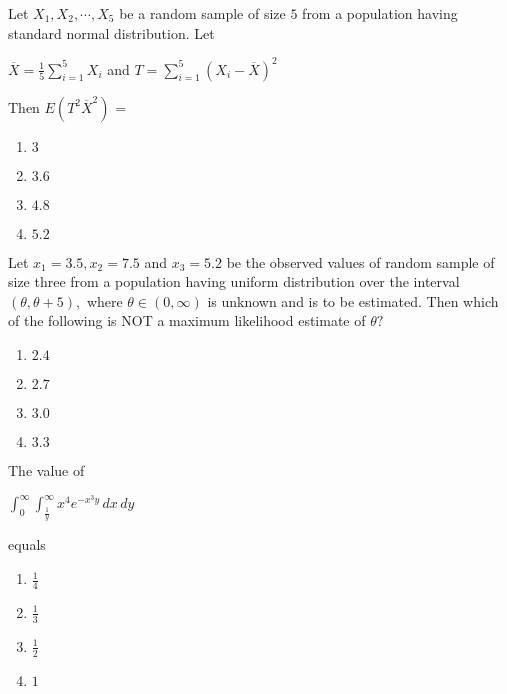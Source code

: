                 \item Let $X_1,X_2, \cdots,X_5$ be a random sample of size $5$ from a population having standard normal distribution. Let
                \begin{center}
                    $\overline{X} = \frac{1}{5}\sum_{i=1}^{5} X_i$ and $T = \sum_{i=1}^{5} (X_i-\overline{X})^2$
                \end{center}
                Then $E(T^2\overline{X}^2)$ =
                \begin{multicols}{4}
                \begin{enumerate}
                    \item $3$
                    \item $3.6$
                    \item $4.8$
                    \item $5.2$
                \end{enumerate}
                    
                \end{multicols}

                \item Let $x_1=3.5, x_2=7.5$ and $x_3=5.2$ be the observed values of random sample of size three from a population having uniform distribution over the interval $(\theta,\theta+5),$ where $\theta \in(0,\infty)$ is unknown and is to be estimated. Then which of the following is NOT a maximum likelihood estimate of $\theta ?$
                \begin{multicols}{4}
                \begin{enumerate}
                    \item $2.4$
                    \item $2.7$
                    \item $3.0$
                    \item $3.3$
                \end{enumerate}
                    
                \end{multicols}

                \item The value of 
                \begin{center}
                    $\int_{0}^{\infty} \int_{\frac{1}{y}}^{\infty} x^4 e^{-x^3 y} \, dx \, dy$
                \end{center}
                equals 
                \begin{multicols}{4}
                \begin{enumerate}
                    \item $\frac{1}{4}$
                    \item $\frac{1}{3}$
                     \item $\frac{1}{2}$
                     \item $1$
                \end{enumerate}
                    
                \end{multicols}

